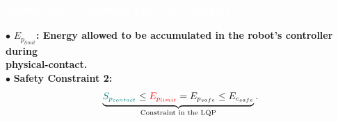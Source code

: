 \begin{frame}
  \frametitle{{\textcolor{white}{\hspace{0.3cm}Safety limit 2 (during physical-contact)}}}

$\bullet$ \textbf{{\color{red}$E_{p_{limit}}$}: {\color{blue}Energy} allowed to be {\color{blue}accumulated} in the robot's controller during \\ \hspace{11mm} {\color{red}physical-contact}.} \\
\vspace{4mm}
$\bullet$ {\color{blue-violet}\textbf{Safety Constraint 2:}}
\vspace{-2mm}
\begin{equation}
\begin{split}
\underbrace{{\color{teal}S_{p_{contact}}} \leq {\color{red}E_{p_{limit}}} = E_{p_{safe}} \leq E_{c_{safe}}}_{\text{Constraint in the LQP}}. \\
\end{split}
\label{eq:Ep_constr}
\end{equation}
       
\end{frame}





